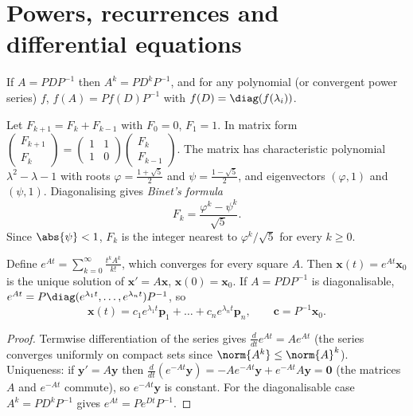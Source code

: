 \section{Powers, recurrences and differential equations}

If $A=PDP^{-1}$ then $A^k=PD^kP^{-1}$, and for any polynomial (or convergent power series) $f$, $f(A)=Pf(D)P^{-1}$ with $f(D)=\diag(f(\lambda_i))$.

\begin{example}\label{ex:fib}
Let $F_{k+1}=F_k+F_{k-1}$ with $F_0=0$, $F_1=1$. In matrix form $\begin{pmatrix}F_{k+1}\\F_k\end{pmatrix}=\begin{pmatrix}1&1\\1&0\end{pmatrix}\begin{pmatrix}F_k\\F_{k-1}\end{pmatrix}$. The matrix has characteristic polynomial $\lambda^2-\lambda-1$ with roots $\varphi=\frac{1+\sqrt5}2$ and $\psi=\frac{1-\sqrt5}2$, and eigenvectors $(\varphi,1)$ and $(\psi,1)$. Diagonalising gives \emph{Binet's formula}
\[ F_k=\frac{\varphi^k-\psi^k}{\sqrt5}. \]
Since $\abs{\psi}<1$, $F_k$ is the integer nearest to $\varphi^k/\sqrt5$ for every $k\ge0$.
\end{example}

\begin{theorem}\label{thm:expm}
Define $e^{At}=\sum_{k=0}^\infty\frac{t^kA^k}{k!}$, which converges for every square $A$. Then $\mathbf{x}(t)=e^{At}\mathbf{x}_0$ is the unique solution of $\mathbf{x}'=A\mathbf{x}$, $\mathbf{x}(0)=\mathbf{x}_0$. If $A=PDP^{-1}$ is diagonalisable, $e^{At}=P\diag(e^{\lambda_1t},\dots,e^{\lambda_nt})P^{-1}$, so
\[ \mathbf{x}(t)=c_1e^{\lambda_1t}\mathbf{p}_1+\dots+c_ne^{\lambda_nt}\mathbf{p}_n,\qquad\mathbf{c}=P^{-1}\mathbf{x}_0. \]
\end{theorem}

\begin{proof}
Termwise differentiation of the series gives $\frac{d}{dt}e^{At}=Ae^{At}$ (the series converges uniformly on compact sets since $\norm{A^k}\le\norm{A}^k$). Uniqueness: if $\mathbf{y}'=A\mathbf{y}$ then $\frac{d}{dt}(e^{-At}\mathbf{y})=-Ae^{-At}\mathbf{y}+e^{-At}A\mathbf{y}=\mathbf{0}$ (the matrices $A$ and $e^{-At}$ commute), so $e^{-At}\mathbf{y}$ is constant. For the diagonalisable case $A^k=PD^kP^{-1}$ gives $e^{At}=Pe^{Dt}P^{-1}$.
\end{proof}

